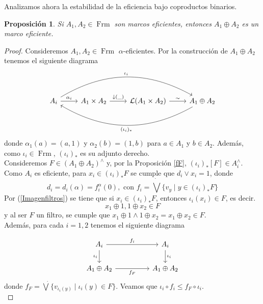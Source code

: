 \documentclass[12pt]{article}
\newtheorem{prop}[thm]{Proposición}
\DeclareMathOperator{\Frm}{Frm}
\begin{document}
Analizamos ahora la estabilidad de la eficiencia bajo coproductos binarios.
\begin{prop}\label{tidyplus}
Si $A_1, A_2\in \Frm$ son marcos eficientes, entonces $A_1\oplus A_2$ es un marco eficiente.
\end{prop}

\begin{proof}
Consideremos $A_1, A_2\in \Frm$ $\alpha$-eficientes. Por la construcción de $A_1\oplus A_2$ tenemos el siguiente diagrama
\[
\begin{tikzcd}
A_i \arrow[r, "\alpha_i"] \arrow[rrr, "\iota_i", bend left] & A_1\times A_2  \arrow[r, "\downarrow(\_)"] & \mathcal{L}(A_1\times A_2) \arrow[r, "\sim"] & A_1\oplus A_2 \arrow[lll, "(\iota_i)_*", bend left]
\end{tikzcd}
\]
donde $\alpha_1(a)=(a, 1)$ y $\alpha_2(b)=(1, b)$ para $a\in A_1$ y $b\in A_2$. Además, como $\iota_i\in \Frm$, $(\iota_i)_*$ es su adjunto derecho.\\

Consideremos $F\in (A_1\oplus A_2)^\wedge$ y, por la Proposición \ref{fF}, $(\iota_i)_*[F]\in A_i^\wedge$. Como $A_i$ es eficiente, para $x_i\in (\iota_i)_*F$ se cumple que $d_i\vee x_i=1$, donde 
\[
d_i=d_i(\alpha)=f_i^\alpha(0), \mbox{ con } f_i=\dot{\bigvee}\{v_y\mid y\in (\iota_i)_*F\}
\]
Por (\ref{Imagenfiltros}) se tiene que si $x_i\in (\iota_i)_*F$, entonces $\iota_i(x_i)\in F$, es decir.
\[
x_1\oplus 1, 1\oplus x_2\in F
\]
y al ser $F$ un filtro, se cumple que $x_1\oplus 1\wedge 1\oplus x_2=x_1\oplus x_2\in F$.\\

Además, para cada $i=1, 2$ tenemos el siguiente diagrama

\[\begin{tikzcd}
	{A_i} && {A_i} \\
	{A_1\oplus A_2} && {A_1\oplus A_2}
	\arrow["{f_i}", from=1-1, to=1-3]
	\arrow["{\iota_i}"', from=1-1, to=2-1]
	\arrow["{\iota_i}", from=1-3, to=2-3]
	\arrow["f_F"', from=2-1, to=2-3]
\end{tikzcd}\]
donde $f_F=\dot{\bigvee}\{v_{\iota_i(y)}\mid \iota_i(y)\in F\}$. Veamos que $\iota_i\circ f_i\leq f_F\circ \iota_i$.\\
    

\end{proof}
\end{document}
